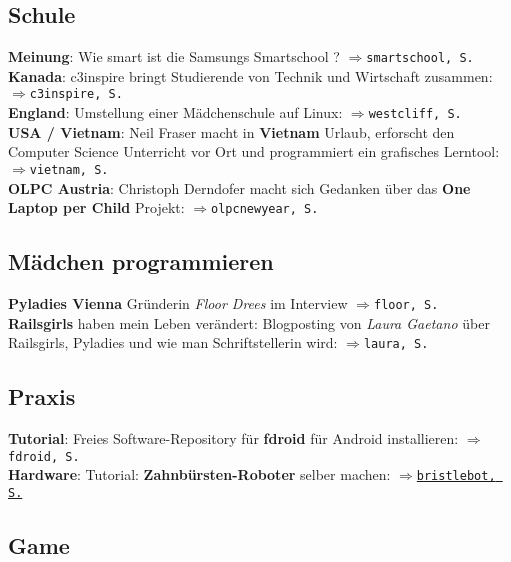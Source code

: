 \subsection*{Schule}

\textbf{Meinung}: Wie smart ist die Samsungs Smartschool ? $\Rightarrow$\texttt{smartschool, S. \pageref{smartschool}}\\
\textbf{Kanada}: c3inspire bringt Studierende von Technik und Wirtschaft zusammen: $\Rightarrow$\texttt{c3inspire, S. \pageref{c3inspire}}\\
\textbf{England}: Umstellung einer Mädchenschule auf Linux: $\Rightarrow$\texttt{westcliff, S. \pageref{westcliff}}\\
\textbf{USA / Vietnam}: Neil Fraser macht in \textbf{Vietnam} Urlaub, erforscht den Computer Science Unterricht vor Ort und programmiert ein grafisches Lerntool: $\Rightarrow$\texttt{vietnam, S. \pageref{vietnam}}\\ 
\textbf{OLPC Austria}: Christoph Derndofer macht sich Gedanken über das \textbf{One Laptop per Child} Projekt: $\Rightarrow$\texttt{olpcnewyear, S. \pageref{olpcnewyear}}\\

\subsection*{Mädchen programmieren}

\textbf{Pyladies Vienna} Gründerin \textit{Floor Drees} im Interview $\Rightarrow$\texttt{floor, S. \pageref{floor}}\\
\textbf{Railsgirls} haben mein Leben verändert: Blogposting von \textit{Laura Gaetano} über Railsgirls, Pyladies und wie man Schriftstellerin wird: $\Rightarrow$\texttt{laura, S.\pageref{laura}}\\

\subsection*{Praxis}

\textbf{Tutorial}: Freies Software-Repository für \textbf{fdroid} für Android installieren: $\Rightarrow$\texttt{fdroid, S. \pageref{fdroid}}\\ \textbf{Hardware}: Tutorial: \textbf{Zahnbürsten-Roboter} selber machen: \hyperlink{bristlebot}{\texttt{$\Rightarrow$bristlebot, S.}} \pageref{bristlebot}\\

\subsection*{Game}

